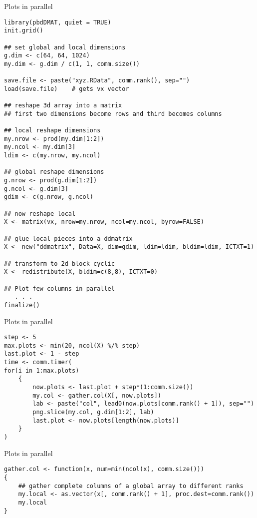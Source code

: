 \begin{frame}
  \begin{exampleblock}{Plots in parallel}\pause
\begin{lstlisting}[title=Getting the Data]
library(pbdDMAT, quiet = TRUE)
init.grid()

## set global and local dimensions
g.dim <- c(64, 64, 1024)
my.dim <- g.dim / c(1, 1, comm.size())

save.file <- paste("xyz.RData", comm.rank(), sep="")
load(save.file)    # gets vx vector

## reshape 3d array into a matrix
## first two dimensions become rows and third becomes columns

## local reshape dimensions
my.nrow <- prod(my.dim[1:2])
my.ncol <- my.dim[3]
ldim <- c(my.nrow, my.ncol)

## global reshape dimensions
g.nrow <- prod(g.dim[1:2])
g.ncol <- g.dim[3]
gdim <- c(g.nrow, g.ncol)

## now reshape local
X <- matrix(vx, nrow=my.nrow, ncol=my.ncol, byrow=FALSE)

## glue local pieces into a ddmatrix
X <- new("ddmatrix", Data=X, dim=gdim, ldim=ldim, bldim=ldim, ICTXT=1)

## transform to 2d block cyclic
X <- redistribute(X, bldim=c(8,8), ICTXT=0)

## Plot few columns in parallel
   . . .
finalize()
\end{lstlisting}
  \end{exampleblock}
\end{frame}

\begin{frame}
  \begin{exampleblock}{Plots in parallel}\pause
\begin{lstlisting}[title=Make comm.size() plots in parallel]
step <- 5
max.plots <- min(20, ncol(X) %/% step)
last.plot <- 1 - step
time <- comm.timer(
for(i in 1:max.plots)
    {
        now.plots <- last.plot + step*(1:comm.size())
        my.col <- gather.col(X[, now.plots])
        lab <- paste("col", lead0(now.plots[comm.rank() + 1]), sep="")
        png.slice(my.col, g.dim[1:2], lab)
        last.plot <- now.plots[length(now.plots)]
    }
)
\end{lstlisting}
  \end{exampleblock}
\end{frame}

\begin{frame}
  \begin{exampleblock}{Plots in parallel}\pause
\begin{lstlisting}[title=gather.col First Attempt (p0\_plot.r)]
gather.col <- function(x, num=min(ncol(x), comm.size()))
{
    ## gather complete columns of a global array to different ranks
    my.local <- as.vector(x[, comm.rank() + 1], proc.dest=comm.rank())
    my.local
}
\end{lstlisting}
  \end{exampleblock}
\end{frame}

